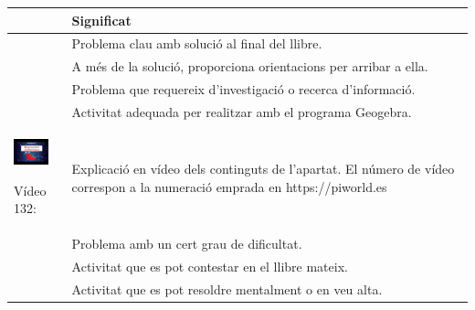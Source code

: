 \begin{center}
	\renewcommand{\arraystretch}{1.5}
\begin{longtable}[h]{>{\raggedleft\arraybackslash}p{}|p{}}
	{\bfseries Símbol} & {\bfseries Significat} \\ \hline
	
	\simbolclau & Problema clau amb solució al final del llibre.  \\ \hline
	
	\simbolcompass & A més de la solució, proporciona orientacions per arribar a ella.  \\ \hline
	
	\simbolsearch & Problema que requereix d'investigació o recerca d'informació.  \\ \hline

	\ggb & Activitat adequada per realitzar amb el programa Geogebra.  \\ \hline
		
	\begin{center}\includegraphics[width=1cm]{img-00/video-132}\par {\footnotesize Vídeo 132:}\end{center} & Explicació en vídeo dels continguts de l'apartat. El número de vídeo correspon a la numeració emprada en https://piworld.es 
	
	\\ \hline
	\hot[2] & Problema amb un cert grau de dificultat. \\ [0.25cm] \hline
	\spen & Activitat que es pot contestar en el llibre mateix. \\ [0.25cm] \hline 
	\mental & Activitat que es pot resoldre mentalment o en veu alta.
\end{longtable}
\end{center}
\vspace{1cm} 
 

